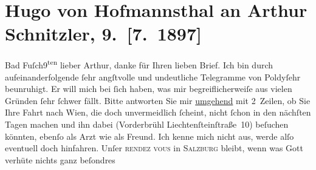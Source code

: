 

               \section[Hugo von Hofmannsthal an Arthur Schnitzler, 9. {[}7. 1897{]}]{ Hugo von Hofmannsthal an Arthur Schnitzler, 9. {[}7. 1897{]}}\nopagebreak{}\rehead{ }\begin{ledgroupsized}[t]{13cm}\normalsize\beginnumbering{} \toendnotes[C]{\smallbreak\pagebreak[2]} 
\pstart
           \raggedleft{}{\pb}Bad Fuſch9\textsuperscript{ten}\pend
           \pstart
           lieber Arthur, danke für Ihren lieben Brief. Ich bin durch
                    aufeinanderfolgende ſehr angſtvolle und undeutliche Telegramme von Poldyſehr beunruhigt. Er will mich bei ſich
                    haben, was mir begreiflicherweiſe aus vielen Gründen ſehr ſchwer fällt. Bitte
                    antworten Sie mir \uline{umgehend} mit 2 Zeilen, ob Sie
                    Ihre Fahrt nach Wien, die doch unvermeidlich
                    ſcheint, nicht ſchon in den nächſten {\pb}Tagen machen und ihn dabei
                        (Vorderbrühl Liechtenſteinſtraße 10)
                    beſuchen könnten, ebenſo als Arzt wie als Freund. Ich kenne mich nicht aus,
                    werde alſo eventuell doch hinfahren.\pend
           \pstart
           Unſer \textsc{rendez vous} in \textsc{Salzburg} bleibt, wenn was Gott verhüte nichts ganz beſondres

\end{ledgroupsized}
